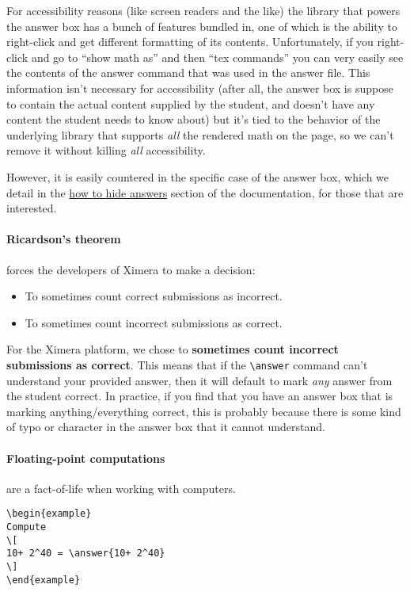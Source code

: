 \documentclass{ximera}
\begin{document}
For accessibility reasons (like screen readers and the like) the library
that powers the answer box has a bunch of features bundled in, one of which is
the ability to right-click and get different formatting of its contents.
Unfortunately, if you right-click and go to ``show math as'' and then ``tex
commands'' you can very easily see the contents of the answer command that was
used in the answer file. This information isn't necessary for accessibility
(after all, the answer box is suppose to contain the actual content supplied by
the student, and doesn't have any content the student needs to know about) but
it's tied to the behavior of the underlying library that supports \textit{all}
the rendered math on the page, so we can't remove it without killing
\textit{all} accessibility.

However, it is easily countered in the specific case of the answer box,
which we detail in the
\href{https://xronos.clas.ufl.edu/examples/exampleCore/supplemental/hiddenAnswers}{how
  to hide answers} section of the documentation, for those that are interested.

\paragraph{Ricardson's theorem} forces the developers of Ximera to make a
decision:
\begin{itemize}
  \item To sometimes count correct submissions as incorrect.
  \item To sometimes count incorrect submissions as correct.
\end{itemize}
For the Ximera platform, we chose to \textbf{sometimes count incorrect
  submissions as correct}. This means that if the \verb|\answer| command
can't understand your provided answer, then it will default to mark
\textit{any} answer from the student correct. In practice, if you find that you
have an answer box that is marking anything/everything correct, this is
probably because there is some kind of typo or character
in the answer box that it cannot understand.

\paragraph{Floating-point computations} are a fact-of-life when working with computers. 

\begin{verbatim}
\begin{example}
Compute
\[
10+ 2^40 = \answer{10+ 2^40}
\]
\end{example}
\end{verbatim}
\end{document}
